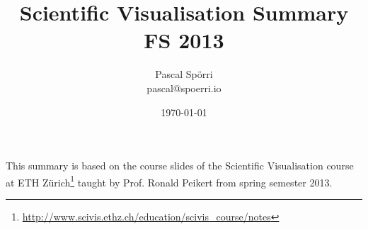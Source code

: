 \documentclass[a4paper]{scrartcl}
\author{Pascal Spörri\\pascal@spoerri.io}
\title{Scientific Visualisation Summary\\ FS 2013\\ }
\date{\today}
\begin{document}
\maketitle
This summary is based on the course slides of the Scientific Visualisation course at ETH Zürich\footnote{\url{http://www.scivis.ethz.ch/education/scivis_course/notes}} taught by Prof. Ronald Peikert from spring semester 2013.
\newpage
\tableofcontents
\newpage
$\ $
\newpage

\newpage

\newpage

\newpage

\newpage

\newpage

\newpage

\newpage

\newpage

\newpage

\newpage

\newpage

\end{document}
